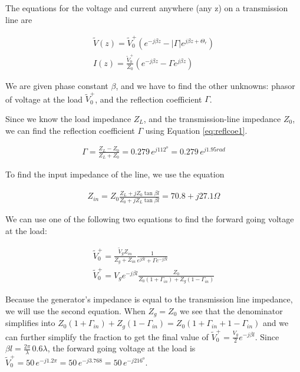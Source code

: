 \documentclass{ximera}
\begin{document}
\begin{example}
\begin{explanation}

The equations for the voltage and current anywhere (any z) on a transmission line  are


\begin{eqnarray}
\tilde{V}(z)= \tilde{V}_0^+ (e^{-j \beta z} - |\Gamma|  e^{j \beta z + \Theta_r}  ) \label{eq:vtlfin} \\
I(z)=   \frac{\tilde{V}_0^+}{Z_0}  (e^{-j \beta z} - \Gamma  e^{j \beta z}  ) \label{eq:itlfin}
\end{eqnarray}

We are given phase constant $\beta$, and we have to find the other unknowns: phasor of voltage at the load $\tilde{V}_0^+$, and the reflection coefficient $\Gamma$.    

Since we know the load impedance $Z_L$, and the transmission-line impedance $Z_0$, we can find the reflection coefficient $\Gamma$ using Equation \ref{eq:reflcoe1}.

\begin{eqnarray}
\Gamma =  \frac{Z_L -Z_0}{Z_L +Z_0}=0.279 \, e^{j112^o}=0.279 \, e^{j1.95 \unit{rad}} \label{eq:reflcoe1}
\end{eqnarray}

To find the input impedance of the line, we use the equation 


\begin{eqnarray}
Z_{in}= Z_0 \frac{Z_L+ j Z_0 \tan \beta l}{Z_0+ j Z_L \tan \beta l} = 70.8+ j 27.1 \Omega
\end{eqnarray}

We can use one of the following two equations to find the forward going voltage at the load:

\begin{eqnarray}
\tilde{V}_0^+= \frac{\tilde{V}_g Z_{in}}{Z_g + Z_{in}} \frac{1}{e^{j \beta l} + \Gamma e^{-j \beta l}} \\
\tilde{V}_0^+=V_g e^{-j \beta l} \frac{Z_0}{Z_0 (1+\Gamma_{in}) +Z_g (1-\Gamma_{in})}
\end{eqnarray}

Because the generator's impedance is equal to the transmission line impedance, we will use the second equation. When $Z_g=Z_0$ we see that the denominator simplifies into $Z_0 (1+\Gamma_{in}) +Z_g (1-\Gamma_{in}) = Z_0 (1+\Gamma_{in}+1-\Gamma_{in})$ and we can further simplify the fraction to get the final value of $\tilde{V}_0^+=\frac{V_g}{2} e^{-j \beta l}$. Since $\beta l = \frac{2 \pi}{\lambda} \, 0.6 \lambda$, the forward going voltage at the load is $\tilde{V}_0^+=50 \, e^{-j1.2 \pi} = 50 \, e^{-j3.768} =50 \, e^{-j216^o} $.




\end{explanation}
\end{example}
\end{document}
